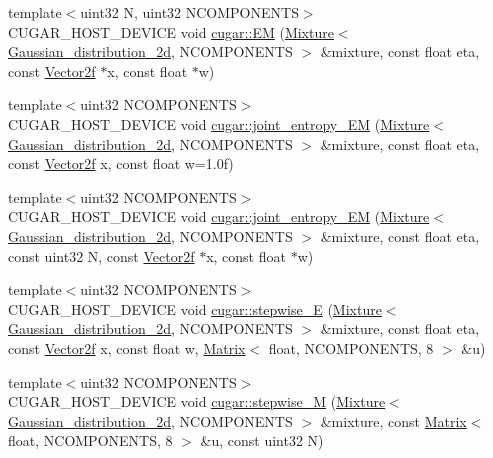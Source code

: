 \begin{DoxyCompactItemize}
\item 
{\footnotesize template$<$uint32 N, uint32 N\+C\+O\+M\+P\+O\+N\+E\+N\+TS$>$ }\\C\+U\+G\+A\+R\+\_\+\+H\+O\+S\+T\+\_\+\+D\+E\+V\+I\+CE void \hyperlink{group___expectation_maximization_module_ga64c58392bf17c4bf5c654e1f508f9850}{cugar\+::\+EM} (\hyperlink{structcugar_1_1_mixture}{Mixture}$<$ \hyperlink{structcugar_1_1_gaussian__distribution__2d}{Gaussian\+\_\+distribution\+\_\+2d}, N\+C\+O\+M\+P\+O\+N\+E\+N\+TS $>$ \&mixture, const float eta, const \hyperlink{structcugar_1_1_vector}{Vector2f} $\ast$x, const float $\ast$w)
\item 
{\footnotesize template$<$uint32 N\+C\+O\+M\+P\+O\+N\+E\+N\+TS$>$ }\\C\+U\+G\+A\+R\+\_\+\+H\+O\+S\+T\+\_\+\+D\+E\+V\+I\+CE void \hyperlink{group___expectation_maximization_module_gaeb4d0f1ac6a25feb55e2433477ab8670}{cugar\+::joint\+\_\+entropy\+\_\+\+EM} (\hyperlink{structcugar_1_1_mixture}{Mixture}$<$ \hyperlink{structcugar_1_1_gaussian__distribution__2d}{Gaussian\+\_\+distribution\+\_\+2d}, N\+C\+O\+M\+P\+O\+N\+E\+N\+TS $>$ \&mixture, const float eta, const \hyperlink{structcugar_1_1_vector}{Vector2f} x, const float w=1.\+0f)
\item 
{\footnotesize template$<$uint32 N\+C\+O\+M\+P\+O\+N\+E\+N\+TS$>$ }\\C\+U\+G\+A\+R\+\_\+\+H\+O\+S\+T\+\_\+\+D\+E\+V\+I\+CE void \hyperlink{group___expectation_maximization_module_ga25d3aceabebc1f90ef6a8e0f2a50d24d}{cugar\+::joint\+\_\+entropy\+\_\+\+EM} (\hyperlink{structcugar_1_1_mixture}{Mixture}$<$ \hyperlink{structcugar_1_1_gaussian__distribution__2d}{Gaussian\+\_\+distribution\+\_\+2d}, N\+C\+O\+M\+P\+O\+N\+E\+N\+TS $>$ \&mixture, const float eta, const uint32 N, const \hyperlink{structcugar_1_1_vector}{Vector2f} $\ast$x, const float $\ast$w)
\item 
{\footnotesize template$<$uint32 N\+C\+O\+M\+P\+O\+N\+E\+N\+TS$>$ }\\C\+U\+G\+A\+R\+\_\+\+H\+O\+S\+T\+\_\+\+D\+E\+V\+I\+CE void \hyperlink{group___expectation_maximization_module_ga3504464ade0e67e978a8f8a91eb20f6b}{cugar\+::stepwise\+\_\+E} (\hyperlink{structcugar_1_1_mixture}{Mixture}$<$ \hyperlink{structcugar_1_1_gaussian__distribution__2d}{Gaussian\+\_\+distribution\+\_\+2d}, N\+C\+O\+M\+P\+O\+N\+E\+N\+TS $>$ \&mixture, const float eta, const \hyperlink{structcugar_1_1_vector}{Vector2f} x, const float w, \hyperlink{structcugar_1_1_matrix}{Matrix}$<$ float, N\+C\+O\+M\+P\+O\+N\+E\+N\+TS, 8 $>$ \&u)
\item 
{\footnotesize template$<$uint32 N\+C\+O\+M\+P\+O\+N\+E\+N\+TS$>$ }\\C\+U\+G\+A\+R\+\_\+\+H\+O\+S\+T\+\_\+\+D\+E\+V\+I\+CE void \hyperlink{group___expectation_maximization_module_ga53b8d4d4e5fe664aa12144c359034b35}{cugar\+::stepwise\+\_\+M} (\hyperlink{structcugar_1_1_mixture}{Mixture}$<$ \hyperlink{structcugar_1_1_gaussian__distribution__2d}{Gaussian\+\_\+distribution\+\_\+2d}, N\+C\+O\+M\+P\+O\+N\+E\+N\+TS $>$ \&mixture, const \hyperlink{structcugar_1_1_matrix}{Matrix}$<$ float, N\+C\+O\+M\+P\+O\+N\+E\+N\+TS, 8 $>$ \&u, const uint32 N)
\end{DoxyCompactItemize}


